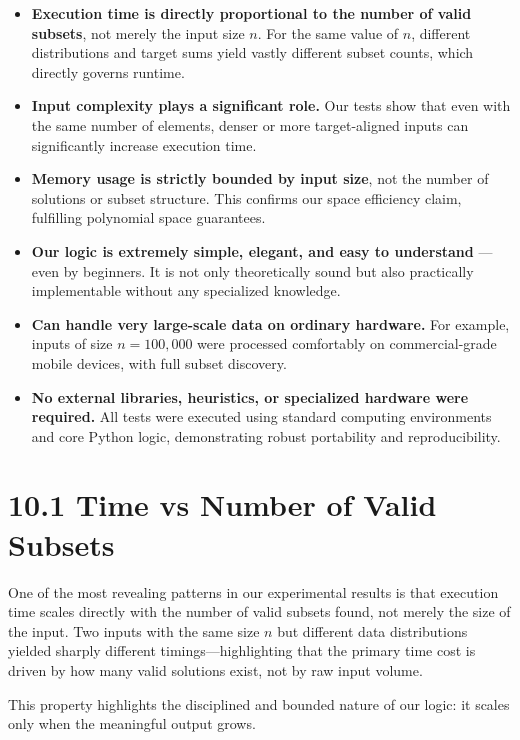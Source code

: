 \documentclass[11pt]{article}
\begin{document}
\begin{itemize}
  \item \textbf{Execution time is directly proportional to the number of valid subsets}, not merely the input size $n$. For the same value of $n$, different distributions and target sums yield vastly different subset counts, which directly governs runtime.
  \item \textbf{Input complexity plays a significant role.} Our tests show that even with the same number of elements, denser or more target-aligned inputs can significantly increase execution time.
  \item \textbf{Memory usage is strictly bounded by input size}, not the number of solutions or subset structure. This confirms our space efficiency claim, fulfilling polynomial space guarantees.
  \item \textbf{Our logic is extremely simple, elegant, and easy to understand} — even by beginners. It is not only theoretically sound but also practically implementable without any specialized knowledge.
  \item \textbf{Can handle very large-scale data on ordinary hardware.} For example, inputs of size $n=100{,}000$ were processed comfortably on commercial-grade mobile devices, with full subset discovery.
  \item \textbf{No external libraries, heuristics, or specialized hardware were required.} All tests were executed using standard computing environments and core Python logic, demonstrating robust portability and reproducibility.
\end{itemize}

\section*{10.1 Time vs Number of Valid Subsets}

One of the most revealing patterns in our experimental results is that execution time scales directly with the number of valid subsets found, not merely the size of the input. Two inputs with the same size \( n \) but different data distributions yielded sharply different timings—highlighting that the primary time cost is driven by how many valid solutions exist, not by raw input volume.

This property highlights the disciplined and bounded nature of our logic: it scales only when the meaningful output grows.

\begin{center}
\end{center}
\end{document}
